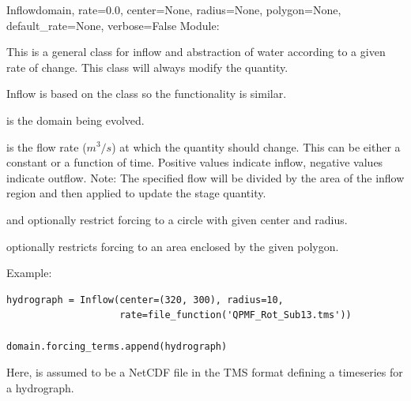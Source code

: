 \documentclass{manual}
\begin{document}
\begin{classdesc}{Inflow}{domain,
                         rate=0.0,
                         center=None, radius=None,
                         polygon=None,
                         default_rate=None,
                         verbose=False}
Module: 

This is a general class for inflow and abstraction of water according to a given rate of change.
This class will always modify the  quantity.

Inflow is based on the  class so the functionality is similar.

 is the domain being evolved.

 is the flow rate ($m^3/s$) at which the quantity should change. This can be either a constant or a
function of time. Positive values indicate inflow, negative values indicate outflow.
Note: The specified flow will be divided by the area of the inflow region and then applied to update the
stage quantity.

 and  optionally restrict forcing to a circle with given center and radius.

 optionally restricts forcing to an area enclosed by the given polygon.

Example:

\begin{verbatim}
hydrograph = Inflow(center=(320, 300), radius=10,
                    rate=file_function('QPMF_Rot_Sub13.tms'))

domain.forcing_terms.append(hydrograph)
\end{verbatim}

Here,  is assumed to be a NetCDF file in the TMS format defining a timeseries for a hydrograph.
\end{classdesc}
\end{document}
